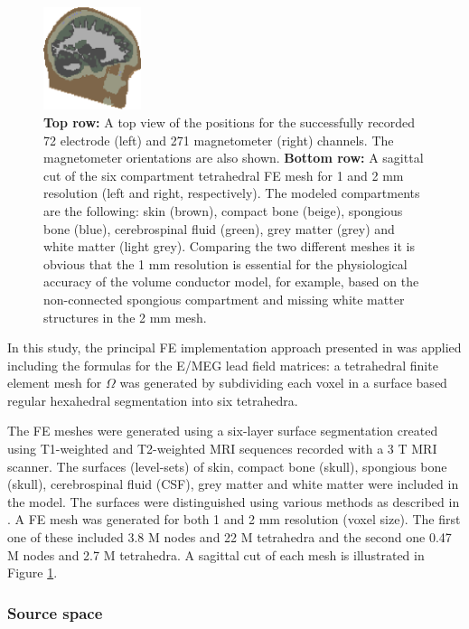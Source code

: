 \documentclass[5p]{elsarticle}
\begin{document}
\begin{figure}[h!]
\begin{footnotesize}
\begin{center}
\begin{minipage}{3.8cm}
\begin{center}
\includegraphics[height=3.0cm]{2mm_mesh.png} 
\end{center}\end{minipage} 
\end{center}
\end{footnotesize}
\caption{{\bf Top row:} A top view of the positions for the successfully recorded 72 electrode (left) and 271 magnetometer (right)   channels. The magnetometer orientations are also shown. {\bf Bottom row:}  A sagittal cut of the six compartment tetrahedral FE mesh for 1 and 2 mm resolution (left and right, respectively). The modeled compartments are the following: skin (brown), compact bone (beige), spongious bone (blue), cerebrospinal fluid (green), grey matter (grey) and white matter (light grey). Comparing the two different meshes it is obvious that the 1 mm resolution is essential for the physiological accuracy of the volume conductor model, for example, based on the non-connected spongious compartment and missing white matter structures in the 2 mm mesh.  }
\label{fig:head_model} 
\end{figure}

In this study, the principal FE implementation approach presented in \citep{pursiainen2012} was applied including the formulas for the E/MEG lead field matrices: a tetrahedral finite element mesh for $\Omega$ was generated by subdividing each voxel in a surface based regular hexahedral segmentation into six tetrahedra.

The FE meshes were generated using a six-layer surface segmentation created using T1-weighted and T2-weighted MRI sequences recorded with a 3 T MRI scanner. The surfaces (level-sets) of  skin, compact bone (skull), spongious bone (skull), cerebrospinal fluid (CSF), grey matter and white matter were included in the model.  The surfaces were distinguished using various methods as described in \cite{nusing2018}. A FE mesh was generated for both 1 and 2 mm resolution (voxel size). The first one of these included 3.8 M nodes and 22 M tetrahedra and the second one 0.47 M nodes and 2.7 M tetrahedra. A sagittal cut of each mesh is illustrated in Figure \ref{fig:head_model}.

\subsubsection{Source space}
\end{document}

